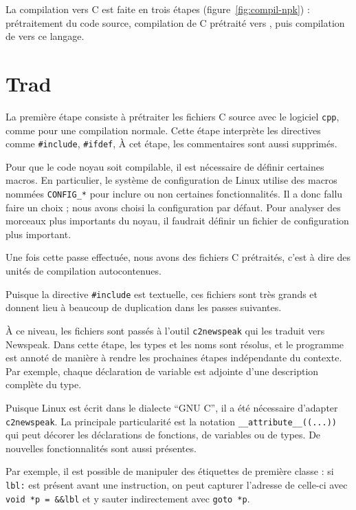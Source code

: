 
La compilation vers C est faite en trois étapes (figure~\ref{fig:compil-npk}) :
prétraitement du code source, compilation de C prétraité vers \newspeak{}, puis
compilation de \newspeak{} vers ce langage.

\section*{Trad}

La première étape consiste à prétraiter les fichiers C source avec le logiciel
\texttt{cpp}, comme pour une compilation normale. Cette étape interprète les
directives comme \texttt{\#include}, \texttt{\#ifdef}, À cet étape, les
commentaires sont aussi supprimés.


Pour que le code noyau soit compilable, il est nécessaire de définir certaines
macros. En particulier, le système de configuration de Linux utilise des macros
nommées \texttt{CONFIG\_*} pour inclure ou non certaines fonctionnalités. Il a
donc fallu faire un choix ; nous avons choisi la configuration par défaut. Pour
analyser des morceaux plus importants du noyau, il faudrait définir un fichier
de configuration plus important.


Une fois cette passe effectuée, nous avons des fichiers C prétraités,
c'est à dire des unités de compilation autocontenues. %

Puisque la directive \texttt{\#include} est textuelle, ces fichiers sont très
grands et donnent lieu à beaucoup de duplication dans les passes suivantes.

À ce niveau, les fichiers sont passés à l'outil \texttt{c2newspeak} qui les
traduit vers Newspeak. Dans cette étape, les types et les noms sont résolus, et
le programme est annoté de manière à rendre les prochaines étapes indépendante
du contexte. Par exemple, chaque déclaration de variable est adjointe d'une
description complète du type.

Puisque Linux est écrit dans le dialecte ``GNU C'', il a été nécessaire
d'adapter \texttt{c2newspeak}. La principale particularité est la notation
\texttt{\_\_attribute\_\_((...))} qui peut décorer les déclarations de
fonctions, de variables ou de types. De nouvelles fonctionnalités sont aussi
présentes.

Par exemple, il est possible de manipuler des étiquettes de première classe : si
\texttt{lbl:} est présent avant une instruction, on peut capturer l'adresse de
celle-ci avec \texttt{void *p = \&\&lbl} et y sauter indirectement avec
\texttt{goto *p}.

